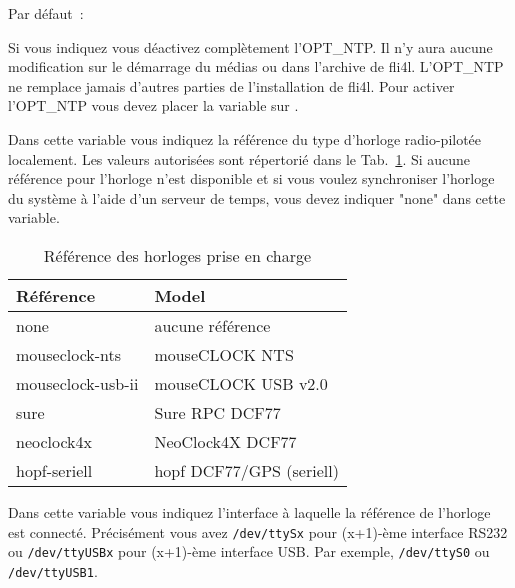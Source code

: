 \begin{description}


  {Par défaut~: 

  Si vous indiquez  vous déactivez complètement l'OPT\_NTP. Il n'y aura
  aucune modification sur le démarrage du médias ou dans l'archive 
  de fli4l. L'OPT\_NTP ne remplace jamais d'autres parties de l'installation de
  fli4l. Pour activer l'OPT\_NTP vous devez placer la variable 
  sur .}


  Dans cette variable vous indiquez la référence du type d'horloge radio-pilotée
  localement. Les valeurs autorisées sont répertorié dans le Tab.~\ref{table:ntp:refclocks}.
  Si aucune référence pour l'horloge n'est disponible et si vous voulez synchroniser
  l'horloge du système à l'aide d'un serveur de temps, vous devez indiquer "none" dans
  cette variable.

  \begin{table}[ht!]
    \centering
    \small
    \caption{Référence des horloges prise en charge}
    \label{table:ntp:refclocks}
    \begin{tabular}{|l|p{7.5cm}|}
      \hline
      Référence & Model \\
      \hline
      none              & aucune référence \\
      mouseclock-nts    & mouseCLOCK NTS \\
      mouseclock-usb-ii & mouseCLOCK USB v2.0\\
      sure              & Sure RPC DCF77 \\
      neoclock4x        & NeoClock4X DCF77 \\
      hopf-seriell      & hopf DCF77/GPS (seriell) \\
      \hline
    \end{tabular}
  \end{table}


  Dans cette variable vous indiquez l'interface à laquelle la référence de l'horloge
  est connecté. Précisément vous avez \texttt{/dev/ttySx} pour (x+1)-ème interface
  RS232 ou \texttt{/dev/ttyUSBx} pour (x+1)-ème interface USB. Par exemple,
  \texttt{/dev/ttyS0} ou \texttt{/dev/ttyUSB1}.


\end{description}
